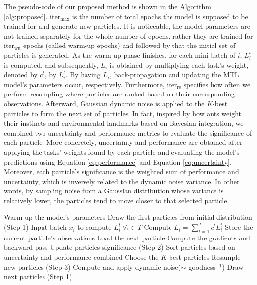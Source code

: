 \documentclass[12pt,a4paper]{article}
\begin{document}
	The pseudo-code of our proposed method is shown in the Algorithm \ref{alg:proposed}. \(\text{iter}_{\max}\) is the number of total epochs the model is supposed to be trained for and generate new particles. It is noticeable, the model parameters are not trained separately for the whole number of epochs, rather they are trained for \(\text{iter}_{\text{wu}}\) epochs (called warm-up epochs) and followed by that the initial set of particles is generated. As the warm-up phase finishes, for each mini-batch of \(i\), \(L^t_i\) is computed, and subsequently, \(L_i\) is obtained by multiplying each task's weight, denoted by \(c^t\), by \(L^t_i\). By having \(L_i\), back-propagation and updating the MTL model's parameters occur, respectively. Furthermore, \(\text{iter}_{\text{rs}}\) specifies how often we perform resampling where particles are ranked based on their corresponding observations. Afterward, Gaussian dynamic noise is applied to the \(K\)-best particles to form the next set of particles. In fact, inspired by how ants weight their instincts and environmental landmarks based on Bayesian integration, we combined two uncertainty and performance metrics to evaluate the significance of each particle. More concretely, uncertainty and performance are obtained after applying the tasks' weights found by each particle and evaluating the model's predictions using Equation \ref{eq:performance} and Equation \ref{eq:uncertainty}. Moreover, each particle's significance is the weighted sum of performance and uncertainty, which is inversely related to the dynamic noise variance. In other words, by sampling noise from a Gaussian distribution whose variance is relatively lower, the particles tend to move closer to that selected particle.
	
	\begin{algorithm}
		\caption{Proposed training algorithm}
		\label{alg:proposed}
		\begin{algorithmic}[1]
			\STATE Warm-up the model's parameters
			\STATE Draw the first particles from initial distribution (Step 1)
			\ENDIF
			\ELSE
			\STATE Input batch $x_i$ to compute $L^t_i \ \forall t \in T$
			\STATE Compute $L_i = \sum_{t=1}^{T} c^t L^t_i$
			\STATE Store the current particle's observations
			\STATE Load the next particle
			\ENDIF
			\STATE Compute the gradients and backward pass
			\ENDFOR
			\STATE Update particles significance (Step 2)
			\STATE Sort particles based on uncertainty and performance combined
			\STATE Choose the $K$-best particles
			\STATE Resample new particles (Step 3)
			\STATE Compute and apply dynamic noise($\sim$ goodness$^{-1}$)
			\STATE Draw next particles (Step 1)
			\ENDIF
			\ENDIF
			\ENDFOR
		\end{algorithmic}
	\end{algorithm}
	
\end{document}
